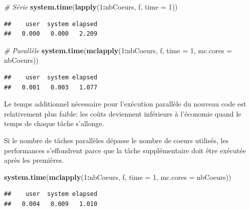 \documentclass[
  12pt,
  french,
  a4paper,
  extrafontsizes,onecolumn,openright
  ]{memoir}
\newenvironment{Shaded}{\begin{snugshade}}{\end{snugshade}}
\newcommand{\CommentTok}[1]{\textcolor[rgb]{0.56,0.35,0.01}{\textit{#1}}}
\newcommand{\DataTypeTok}[1]{\textcolor[rgb]{0.13,0.29,0.53}{#1}}
\newcommand{\DecValTok}[1]{\textcolor[rgb]{0.00,0.00,0.81}{#1}}
\newcommand{\KeywordTok}[1]{\textcolor[rgb]{0.13,0.29,0.53}{\textbf{#1}}}
\newcommand{\NormalTok}[1]{#1}
\newcommand{\OperatorTok}[1]{\textcolor[rgb]{0.81,0.36,0.00}{\textbf{#1}}}
\newlength{\rf}
\begin{document}
\scriptsize

\begin{Shaded}
\begin{Highlighting}[]
\CommentTok{# Série}
\KeywordTok{system.time}\NormalTok{(}\KeywordTok{lapply}\NormalTok{(}\DecValTok{1}\OperatorTok{:}\NormalTok{nbCoeurs, f, }\DataTypeTok{time =} \DecValTok{1}\NormalTok{))}
\end{Highlighting}
\end{Shaded}

\begin{verbatim}
##    user  system elapsed 
##   0.000   0.000   2.209
\end{verbatim}

\begin{Shaded}
\begin{Highlighting}[]
\CommentTok{# Parallèle}
\KeywordTok{system.time}\NormalTok{(}\KeywordTok{mclapply}\NormalTok{(}\DecValTok{1}\OperatorTok{:}\NormalTok{nbCoeurs, f, }\DataTypeTok{time =} \DecValTok{1}\NormalTok{, }\DataTypeTok{mc.cores =}\NormalTok{ nbCoeurs))}
\end{Highlighting}
\end{Shaded}

\begin{verbatim}
##    user  system elapsed 
##   0.001   0.003   1.077
\end{verbatim}

\normalsize

Le temps additionnel nécessaire pour l'exécution parallèle du nouveau code est relativement plus faible: les coûts deviennent inférieurs à l'économie quand le temps de chaque tâche s'allonge.

Si le nombre de tâches parallèles dépasse le nombre de coeurs utilisés, les performances s'effondrent parce que la tâche supplémentaire doit être exécutée après les premières.

\scriptsize

\begin{Shaded}
\begin{Highlighting}[]
\KeywordTok{system.time}\NormalTok{(}\KeywordTok{mclapply}\NormalTok{(}\DecValTok{1}\OperatorTok{:}\NormalTok{nbCoeurs, f, }\DataTypeTok{time =} \DecValTok{1}\NormalTok{, }\DataTypeTok{mc.cores =}\NormalTok{ nbCoeurs))}
\end{Highlighting}
\end{Shaded}

\begin{verbatim}
##    user  system elapsed 
##   0.004   0.009   1.010
\end{verbatim}
\end{document}
